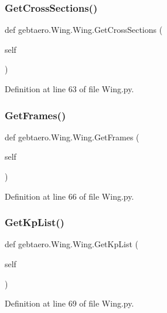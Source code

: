 \subsubsection{\texorpdfstring{Get\+Cross\+Sections()}{GetCrossSections()}}
{\footnotesize\ttfamily def gebtaero.\+Wing.\+Wing.\+Get\+Cross\+Sections (\begin{DoxyParamCaption}\item[{}]{self }\end{DoxyParamCaption})}



Definition at line 63 of file Wing.\+py.

\mbox{\label{classgebtaero_1_1_wing_1_1_wing_a0bd0def91e16cd1a19b10fcdf8c50e41}} 
\subsubsection{\texorpdfstring{Get\+Frames()}{GetFrames()}}
{\footnotesize\ttfamily def gebtaero.\+Wing.\+Wing.\+Get\+Frames (\begin{DoxyParamCaption}\item[{}]{self }\end{DoxyParamCaption})}



Definition at line 66 of file Wing.\+py.

\mbox{\label{classgebtaero_1_1_wing_1_1_wing_afe768db8f9a06bd5784143c1168a5acc}} 
\subsubsection{\texorpdfstring{Get\+Kp\+List()}{GetKpList()}}
{\footnotesize\ttfamily def gebtaero.\+Wing.\+Wing.\+Get\+Kp\+List (\begin{DoxyParamCaption}\item[{}]{self }\end{DoxyParamCaption})}



Definition at line 69 of file Wing.\+py.

